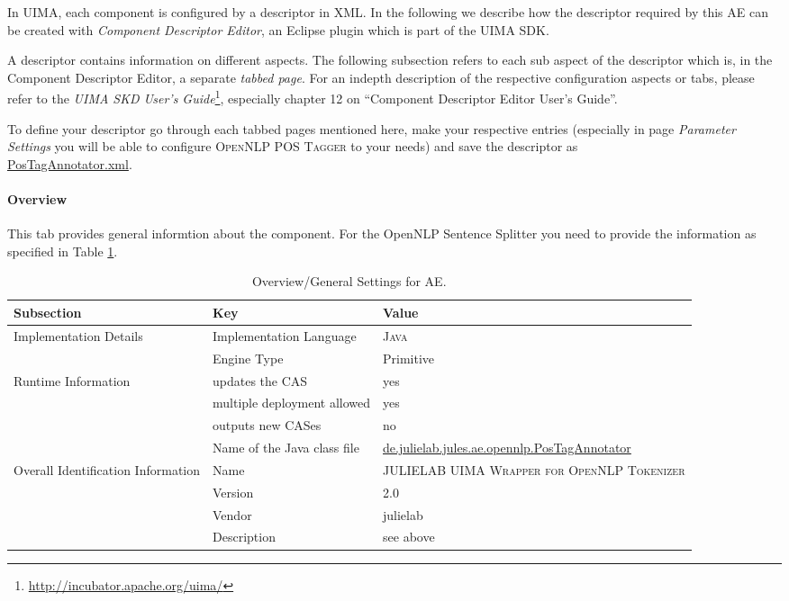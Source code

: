 \documentclass[11pt,a4paper,halfparskip]{scrartcl}
\begin{document}
In UIMA, each component is configured by a descriptor in XML. In the
following we describe how the descriptor required by this AE can be
created with \emph{Component Descriptor Editor}, an Eclipse plugin
which is part of the UIMA SDK.

A descriptor contains information on different aspects. The following
subsection refers to each sub aspect of the descriptor which is, in
the Component Descriptor Editor, a separate \emph{tabbed page}. For an
indepth description of the respective configuration aspects or tabs,
please refer to the \emph{UIMA SKD User's
  Guide}\footnote{\url{http://incubator.apache.org/uima/}}, especially
chapter 12 on ``Component Descriptor Editor User's Guide''.

To define your descriptor go through each tabbed pages mentioned
here, make your respective entries (especially in page \emph{Parameter
Settings} you will be able to configure \textsc{OpenNLP POS Tagger} 
to your needs) and save the descriptor as \\ \url{PosTagAnnotator.xml}.

\paragraph{Overview}
This tab provides general informtion about the component. For the
OpenNLP Sentence Splitter you need to provide the information as
specified in Table
\ref{tab:overview}.

\begin{table}[h!]
  \centering
  \begin{tabular}{|p{3.5cm}|p{4cm}|p{6cm}|}
    \hline
    Subsection & Key & Value \\
    \hline\hline
    Implementation Details & Implementation Language &  \textsc{Java} \\
    \cline{2-3}
    & Engine Type & Primitive\\
    \hline
    Runtime Information & updates the CAS & yes  \\
    \cline{2-3}
    & multiple deployment allowed & yes \\
    \cline{2-3}
    & outputs new CASes & no \\
    \cline{2-3}
    & Name of the Java class file & \url{de.julielab.jules.ae.opennlp.PosTagAnnotator}\\
    \hline
    Overall Identification Information & Name & \textsc{JULIELAB UIMA Wrapper for OpenNLP Tokenizer}
\\
    \cline{2-3}
    & Version & 2.0 \\
    \cline{2-3}
    & Vendor & julielab\\
    \cline{2-3}
    & Description & see above\\
    \hline
  \end{tabular}
  \caption{Overview/General Settings for AE.}
  \label{tab:overview}
\end{table}
\end{document}
